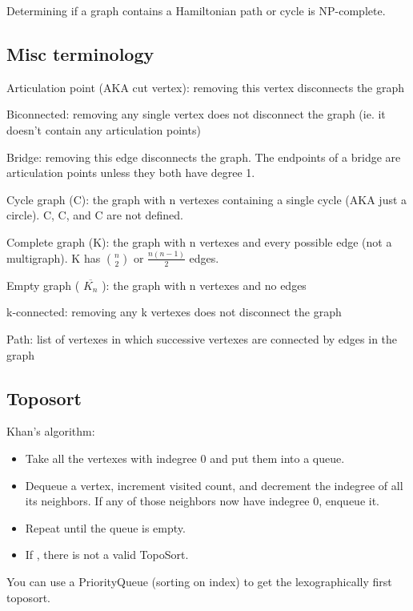 Determining if a graph contains a Hamiltonian path or cycle is NP-complete.

\subsection*{Misc terminology}

Articulation point (AKA cut vertex): removing this vertex disconnects the graph

Biconnected: removing any single vertex does not disconnect the graph (ie. it doesn't contain any articulation points)

Bridge: removing this edge disconnects the graph. The endpoints of a bridge are articulation points unless they both have degree 1.

Cycle graph (C): the graph with n vertexes containing a single cycle (AKA just a circle). C, C, and C are not defined.

Complete graph (K): the graph with n vertexes and every possible edge (not a multigraph). K has $\binom{n}{2}$ or $\frac{n(n-1)}{2}$ edges.

Empty graph ( $\overline{K_n}$ ): the graph with n vertexes and no edges

k-connected: removing any k vertexes does not disconnect the graph

Path: list of vertexes in which successive vertexes are connected by edges in the graph

\subsection*{Toposort}

Khan's algorithm: 
\begin{itemize}
    \item Take all the vertexes with indegree 0 and put them into a queue.
    \item Dequeue a vertex, increment visited count, and decrement the indegree of all its neighbors. If any of those neighbors now have indegree 0, enqueue it.
    \item Repeat until the queue is empty.
    \item If , there is not a valid TopoSort.
\end{itemize}

You can use a PriorityQueue (sorting on index) to get the lexographically first toposort.

